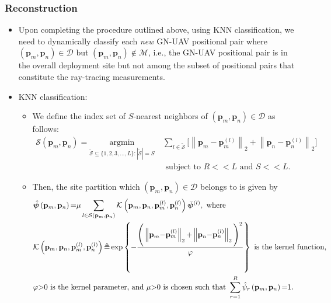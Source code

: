 \documentclass{article}
\newcommand{\norm}[1]{\left\lVert#1\right\rVert}
\begin{document}
\subsubsection{Reconstruction}
\begin{itemize}
    \item Upon completing the procedure outlined above, using KNN classification, we need to dynamically classify each \emph{new} GN-UAV positional pair where $\left(\mathbf{p}_{m},\mathbf{p}_{n}\right){\in}\mathcal{D}$ but $\left(\mathbf{p}_{m},\mathbf{p}_{n}\right){\notin}\mathcal{M}$, i.e., the GN-UAV positional pair is in the overall deployment site but not among the subset of positional pairs that constitute the ray-tracing measurements.
    \item KNN classification:
    \begin{itemize}
        \item We define the index set of $S$-nearest neighbors of $\left(\mathbf{p}_{m},\mathbf{p}_{n}\right){\in}\mathcal{D}$ as follows:
        \begin{align}\label{Neighbors}
            \mathcal{S}\left(\mathbf{p}_{m},\mathbf{p}_{n}\right){=}\underset{\tilde{\mathcal{S}}{\subseteq}\{1,2,3,{\dots},L\}:|\tilde{\mathcal{S}}|{=}S}{\mathrm{argmin}}\ &\sum_{l{\in}\tilde{\mathcal{S}}}\Bigg[\norm{\mathbf{p}_{m}{-}\mathbf{p}_{m}^{(l)}}_{2}{+}\norm{\mathbf{p}_{n}{-}\mathbf{p}_{n}^{(l)}}_{2}\Bigg]\nonumber\\&\text{ subject to }R{<<}L\text{ and }S{<<}L.
        \end{align}
        \item Then, the site partition which $\left(\mathbf{p}_{m},\mathbf{p}_{n}\right){\in}\mathcal{D}$ belongs to is given by
        \begin{align}\label{Classification}
            &\hat{\boldsymbol{\psi}}\left(\mathbf{p}_{m},\mathbf{p}_{n}\right){=}\mu\sum_{l{\in}\mathcal{S}\left(\mathbf{p}_{m},\mathbf{p}_{n}\right)}\mathcal{K}\left(\mathbf{p}_{m},\mathbf{p}_{n},\mathbf{p}_{m}^{(l)},\mathbf{p}_{n}^{(l)}\right)\Bar{\boldsymbol{\psi}}^{(l)},\text{ where}\\
            &\mathcal{K}\left(\mathbf{p}_{m},\mathbf{p}_{n},\mathbf{p}_{m}^{(l)},\mathbf{p}_{n}^{(l)}\right){\triangleq}\exp\left\{-\frac{\Bigg(\norm{\mathbf{p}_{m}{-}\mathbf{p}_{m}^{(l)}}_{2}{+}\norm{\mathbf{p}_{n}{-}\mathbf{p}_{n}^{(l)}}_{2}\Bigg)^{2}}{\varphi}\right\}\text{ is the kernel function,}\nonumber\\&\varphi{>}0\text{ is the kernel parameter, and }\mu{>}0\text{ is chosen such that }\sum_{r{=}1}^{R}\hat{\psi}_{r}\left(\mathbf{p}_{m},\mathbf{p}_{n}\right){=}1.\nonumber

\end{align}
\end{itemize}
\end{itemize}
\end{document}
